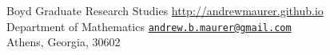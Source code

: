 \documentclass[10pt,a4paper]{article}
\begin{document}

\sloppy  %



\spacedhrule{0.9em}{-0.4em}  %

\vspace{0.3in}
\noindent
Boyd Graduate Research Studies\tabto{9.4cm} \url{http://andrewmaurer.github.io} \\
Department of Mathematics \tabto{9.4cm} \href{mailto:andrew.b.maurer@gmail.com}{\texttt{andrew.b.maurer@gmail.com}} \\
Athens, Georgia, 30602 \ \\
\vspace{-0.4in}
\tabto{16.9cm}
\end{document}
